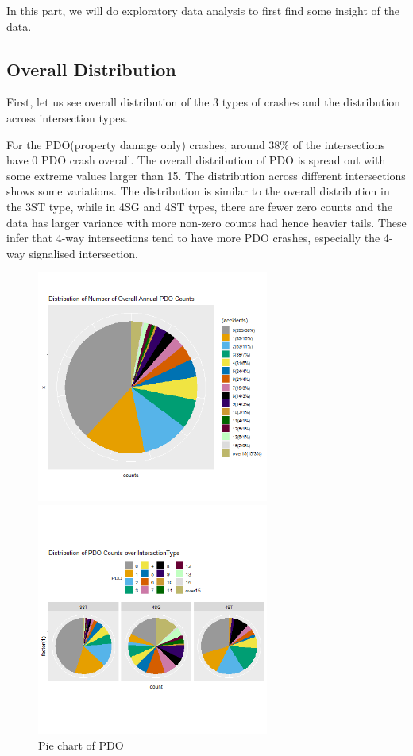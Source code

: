 \documentclass[11pt]{scrartcl} %
\begin{document}
In this part, we will do exploratory data analysis to first find some insight of the data.

\subsection{Overall Distribution}

First, let us see overall distribution of the 3 types of crashes and the distribution across intersection types.

For the PDO(property damage only) crashes, around 38\% of the intersections have 0 PDO crash overall. The overall distribution of PDO is spread out with some extreme values larger than 15. The distribution across different intersections shows some variations. The distribution is similar to the overall distribution in the 3ST type, while in 4SG and 4ST types, there are fewer zero counts and the data has larger variance with more non-zero counts had hence heavier tails. These infer that 4-way intersections tend to have more PDO crashes, especially the 4-way signalised intersection.

\begin{figure}[H]
\begin{minipage}[t]{0.5\linewidth}
\centering
\includegraphics[width=3in]{image/p111.png}
\small
\end{minipage}
\begin{minipage}[t]{0.5\linewidth}
\centering
\includegraphics[width=3in]{image/p121_PDO.png}
\small
\end{minipage}
\caption{Pie chart of PDO}
\end{figure}
\end{document}
